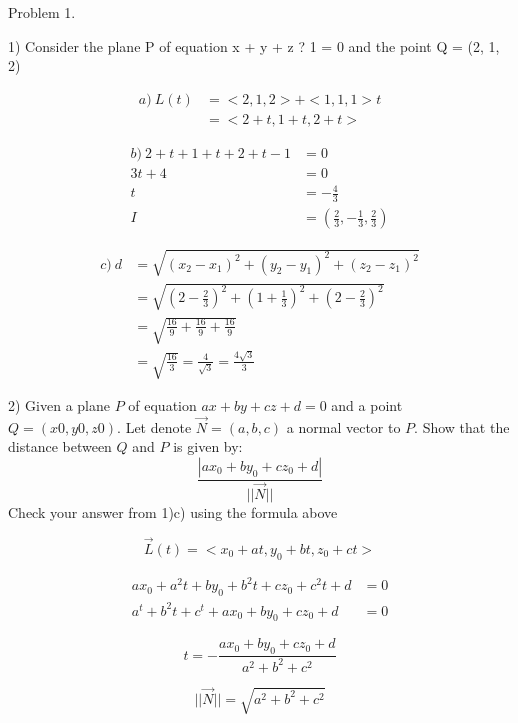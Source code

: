 \documentclass{article}
\begin{document}
\begin{text}
Problem 1. \\
\end{text}

\begin{text}
1) Consider the plane P of equation x + y + z ? 1 = 0 and the point Q = (2, 1, 2)
\end{text}

\begin{align*}
a) \: L(t) &= < 2, 1, 2 > + < 1, 1, 1 >t \\
&= < 2 + t, 1 + t, 2 + t >
\end{align*}

\begin{align*}
b) \: 2 + t + 1 + t + 2 + t -1 &= 0 \\
3t + 4 &= 0 \\
t &= -\frac{4}{3} \\
I &= (\frac{2}{3}, -\frac{1}{3}, \frac{2}{3})
\end{align*}

\begin{align*}
c) \: d &= \sqrt{(x_2 - x_1)^2 + (y_2 - y_1)^2 + (z_2 - z_1)^2} \\
&= \sqrt{(2 - \frac{2}{3})^2 + (1 + \frac{1}{3})^2 + (2 - \frac{2}{3})^2} \\
&= \sqrt{\frac{16}{9} + \frac{16}{9} + \frac{16}{9}} \\
&= \sqrt{\frac{16}{3}} = \frac{4}{\sqrt{3}} = \frac{4\sqrt{3}}{3}
\end{align*}

\begin{text}
2) Given a plane $P$ of equation $ax + by + cz + d = 0$ and a point $Q = (x0, y0, z0)$. Let denote $\vec{N} = (a, b, c)$ a normal vector to $P$.
Show that the distance between $Q$ and $P$ is given by:
$$
\frac{|ax_0 + by_0 + cz_0 + d|}{||\vec{N}||}
$$
Check your answer from 1)c) using the formula above
\end{text}


$$
\vec{L}(t) = <x_0 + at, y_0 + bt, z_0 + ct>
$$

\begin{align*}
ax_0 + a^2t + by_0 + b^2t + cz_0 + c^2t + d &= 0 \\
a^t + b^2t + c^t + ax_0 + by_0 + cz_0 +d &= 0
\end{align*}

$$
t = -\frac{ax_0 + by_0 + cz_0 + d}{a^2 + b^2 + c^2}
$$

$$
||\vec{N}|| = \sqrt{a^2+b^2+c^2}
$$
\end{document}
